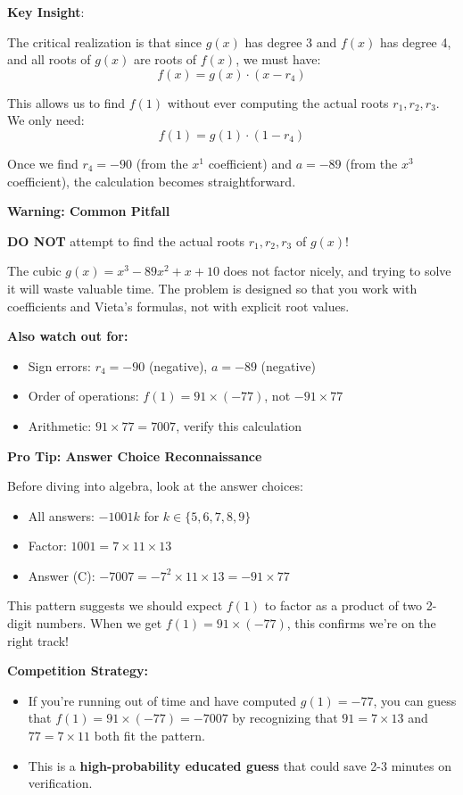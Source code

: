 \documentclass[]{article}
\begin{document}
\begin{keyinsightbox}
\textbf{Key Insight}: 

The critical realization is that since $g(x)$ has degree 3 and $f(x)$ has degree 4, and all roots of $g(x)$ are roots of $f(x)$, we must have:
\[f(x) = g(x) \cdot (x - r_4)\]

This allows us to find $f(1)$ without ever computing the actual roots $r_1, r_2, r_3$. We only need:
\[f(1) = g(1) \cdot (1 - r_4)\]

Once we find $r_4 = -90$ (from the $x^1$ coefficient) and $a = -89$ (from the $x^3$ coefficient), the calculation becomes straightforward.
\end{keyinsightbox}

\begin{warningbox}
\textbf{Warning: Common Pitfall}

\textbf{DO NOT} attempt to find the actual roots $r_1, r_2, r_3$ of $g(x)$!

The cubic $g(x) = x^3 - 89x^2 + x + 10$ does not factor nicely, and trying to solve it will waste valuable time. The problem is designed so that you work with coefficients and Vieta's formulas, not with explicit root values.

\textbf{Also watch out for:}
\begin{itemize}
    \item Sign errors: $r_4 = -90$ (negative), $a = -89$ (negative)
    \item Order of operations: $f(1) = 91 \times (-77)$, not $-91 \times 77$
    \item Arithmetic: $91 \times 77 = 7007$, verify this calculation
\end{itemize}
\end{warningbox}

\begin{tipbox}
\textbf{Pro Tip: Answer Choice Reconnaissance}

Before diving into algebra, look at the answer choices:
\begin{itemize}
    \item All answers: $-1001k$ for $k \in \{5,6,7,8,9\}$
    \item Factor: $1001 = 7 \times 11 \times 13$
    \item Answer (C): $-7007 = -7^2 \times 11 \times 13 = -91 \times 77$
\end{itemize}

This pattern suggests we should expect $f(1)$ to factor as a product of two 2-digit numbers. When we get $f(1) = 91 \times (-77)$, this confirms we're on the right track!

\textbf{Competition Strategy:} 
\begin{itemize}
    \item If you're running out of time and have computed $g(1) = -77$, you can guess that $f(1) = 91 \times (-77) = -7007$ by recognizing that $91 = 7 \times 13$ and $77 = 7 \times 11$ both fit the pattern.
    \item This is a \textbf{high-probability educated guess} that could save 2-3 minutes on verification.
\end{itemize}
\end{tipbox}
\end{document}
